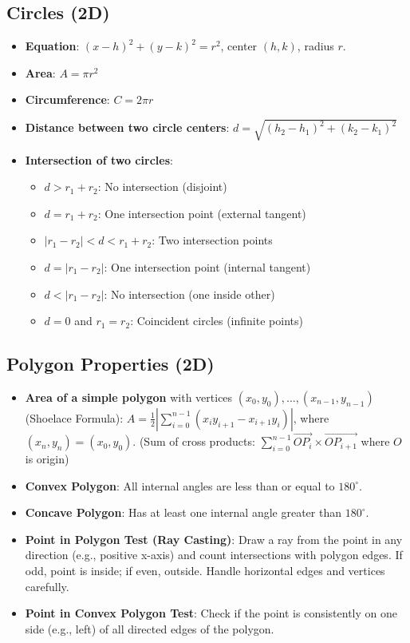 \subsection*{Circles (2D)}
\begin{itemize}
    \item \textbf{Equation}: $(x-h)^2 + (y-k)^2 = r^2$, center $(h,k)$, radius $r$.
    \item \textbf{Area}: $A = \pi r^2$
    \item \textbf{Circumference}: $C = 2\pi r$
    \item \textbf{Distance between two circle centers}: $d = \sqrt{(h_2-h_1)^2 + (k_2-k_1)^2}$
    \item \textbf{Intersection of two circles}:
        \begin{itemize}
            \item $d > r_1 + r_2$: No intersection (disjoint)
            \item $d = r_1 + r_2$: One intersection point (external tangent)
            \item $|r_1 - r_2| < d < r_1 + r_2$: Two intersection points
            \item $d = |r_1 - r_2|$: One intersection point (internal tangent)
            \item $d < |r_1 - r_2|$: No intersection (one inside other)
            \item $d=0$ and $r_1=r_2$: Coincident circles (infinite points)
        \end{itemize}
\end{itemize}

\subsection*{Polygon Properties (2D)}
\begin{itemize}
    \item \textbf{Area of a simple polygon} with vertices $(x_0, y_0), \dots, (x_{n-1}, y_{n-1})$ (Shoelace Formula):
    $A = \frac{1}{2} \left| \sum_{i=0}^{n-1} (x_i y_{i+1} - x_{i+1} y_i) \right|$, where $(x_n, y_n) = (x_0, y_0)$.
    (Sum of cross products: $\sum_{i=0}^{n-1} \vec{OP_i} \times \vec{OP_{i+1}}$ where $O$ is origin)
    \item \textbf{Convex Polygon}: All internal angles are less than or equal to $180^\circ$.
    \item \textbf{Concave Polygon}: Has at least one internal angle greater than $180^\circ$.
    \item \textbf{Point in Polygon Test (Ray Casting)}: Draw a ray from the point in any direction (e.g., positive x-axis) and count intersections with polygon edges. If odd, point is inside; if even, outside. Handle horizontal edges and vertices carefully.
    \item \textbf{Point in Convex Polygon Test}: Check if the point is consistently on one side (e.g., left) of all directed edges of the polygon.
\end{itemize}

